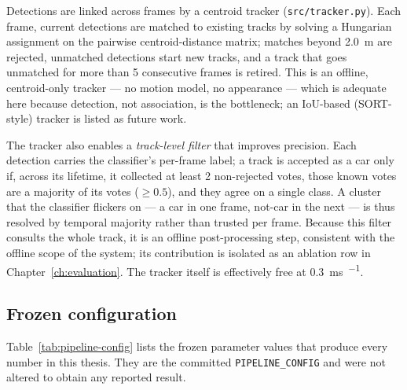 Detections are linked across frames by a centroid tracker
(\texttt{src/tracker.py}). Each frame, current detections are matched to existing
tracks by solving a Hungarian assignment on the pairwise centroid-distance
matrix; matches beyond \SI{2.0}{\meter} are rejected, unmatched detections start
new tracks, and a track that goes unmatched for more than \num{5} consecutive
frames is retired. This is an offline, centroid-only tracker --- no motion model,
no appearance --- which is adequate here because detection, not association, is
the bottleneck; an IoU-based (SORT-style) tracker is listed as future work.

The tracker also enables a \emph{track-level filter} that improves precision.
Each detection carries the classifier's per-frame label; a track is accepted as a
car only if, across its lifetime, it collected at least \num{2} non-rejected
votes, those known votes are a majority of its votes
($\geq \num{0.5}$), and they agree on a single class. A cluster that the
classifier flickers on --- a car in one frame, not-car in the next --- is thus
resolved by temporal majority rather than trusted per frame. Because this filter
consults the whole track, it is an offline post-processing step, consistent with
the offline scope of the system; its contribution is isolated as an ablation row
in Chapter~\ref{ch:evaluation}. The tracker itself is effectively free at
\SI{0.3}{\milli\second\per\frame}.

\subsection{Frozen configuration}
\label{sec:pipeline-config}

Table~\ref{tab:pipeline-config} lists the frozen parameter values that produce
every number in this thesis. They are the committed \texttt{PIPELINE\_CONFIG} and
were not altered to obtain any reported result.

